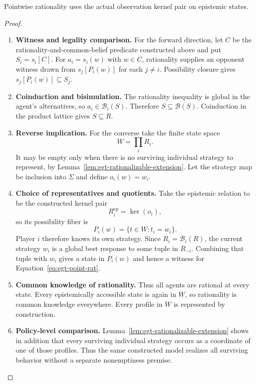 \documentclass[11pt,a4paper]{article}
\numberwithin{equation}{section}
\theoremstyle{definition}
\theoremstyle{remark}
\theoremstyle{plain}
\begin{document}
\noindent Pointwise rationality uses the actual observation kernel pair on epistemic states.
\begin{center}
\end{center}


\begin{proof}
\leavevmode
\begin{enumerate}[label=\textup{(\arabic*)},leftmargin=*,itemsep=4pt,topsep=3pt]
  \item \textbf{Witness and legality comparison.} For the forward direction, let $C$ be the rationality-and-common-belief
predicate constructed above and put $S_i=s_i[C]$. For $a_i=s_i(w)$ with $w\in C$, rationality supplies an opponent
witness drawn from $s_j[P_i(w)]$ for each $j\ne i$. Possibility closure gives $s_j[P_i(w)]\subseteq S_j$.
  \item \textbf{Coinduction and bisimulation.} The rationality inequality is global in the agent's alternatives,
so $a_i\in\mathcal B_i(S)$. Therefore $S\subseteq\mathcal B(S)$. Coinduction in the product lattice gives $S\subseteq R$.
  \item \textbf{Reverse implication.} For the converse take the finite state space
\[
 W=\prod_iR_i.
\]
It may be empty only when there is no surviving individual strategy to
represent, by Lemma~\ref{lem:egt-rationalizable-extension}. Let the strategy
map be inclusion into
$\Sigma$ and define $o_i(w)=w_i$.
  \item \textbf{Choice of representatives and quotients.} Take the epistemic relation to be the
constructed kernel pair
\[
 R_i^{\mathrm{ep}}=\ker(o_i),
\]
so its possibility fiber is
\[
 P_i(w)=\{t\in W:t_i=w_i\}.
\]
Player $i$ therefore knows its own strategy. Since
$R_i=\mathcal B_i(R)$, the current strategy $w_i$ is a global best response
to some tuple in $R_{-i}$. Combining that tuple with $w_i$ gives a state in
$P_i(w)$ and hence a witness for Equation~\eqref{eq:egt-point-rat}.
  \item \textbf{Common knowledge of rationality.} Thus all
agents are rational at every state. Every epistemically accessible state is
again in $W$, so rationality is common knowledge everywhere. Every profile in
$W$ is represented by construction.
  \item \textbf{Policy-level comparison.} Lemma~\ref{lem:egt-rationalizable-extension}
shows in addition that every surviving individual strategy occurs as a
coordinate of one of those profiles. Thus the same constructed model realizes
all surviving behavior without a separate nonemptiness premise.
\end{enumerate}
\end{proof}
\end{document}
